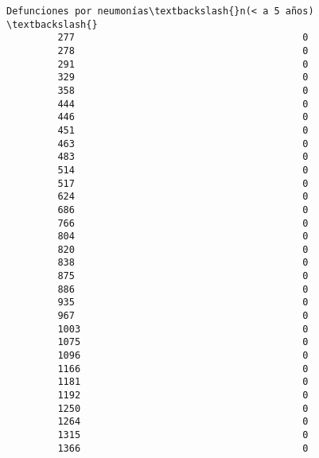 \documentclass[11pt]{article}
\begin{document}
\begin{Verbatim}[commandchars=\\\{\}]
              Defunciones por neumonías\textbackslash{}n(< a 5 años)  \textbackslash{}
         277                                        0   
         278                                        0   
         291                                        0   
         329                                        0   
         358                                        0   
         444                                        0   
         446                                        0   
         451                                        0   
         463                                        0   
         483                                        0   
         514                                        0   
         517                                        0   
         624                                        0   
         686                                        0   
         766                                        0   
         804                                        0   
         820                                        0   
         838                                        0   
         875                                        0   
         886                                        0   
         935                                        0   
         967                                        0   
         1003                                       0   
         1075                                       0   
         1096                                       0   
         1166                                       0   
         1181                                       0   
         1192                                       0   
         1250                                       0   
         1264                                       0   
         1315                                       0   
         1366                                       0   
         

\end{Verbatim}
\end{document}
